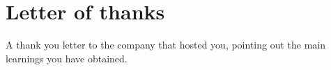 \chapter{Letter of thanks}
A thank you letter to the company that hosted you, pointing out the main learnings you have obtained. 